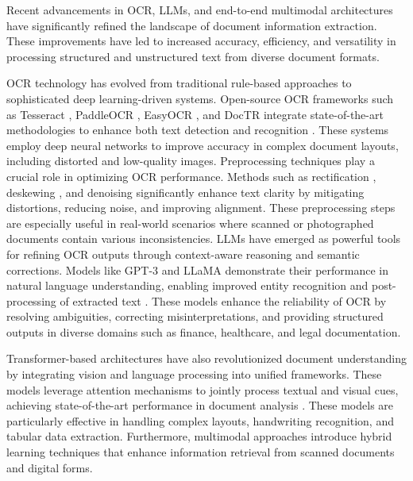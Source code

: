 \documentclass[11pt]{article}
\begin{document}
Recent advancements in OCR, LLMs, and end-to-end multimodal architectures have significantly refined the landscape of document information extraction. These improvements have led to increased accuracy, efficiency, and versatility in processing structured and unstructured text from diverse document formats.

OCR technology has evolved from traditional rule-based approaches to sophisticated deep learning-driven systems. Open-source OCR frameworks such as Tesseract \cite{tesseract}, PaddleOCR \cite{ppocrv2}, EasyOCR \cite{easyocr}, and DocTR \cite{doctr} integrate state-of-the-art methodologies to enhance both text detection \cite{liao2019, liao2022} and recognition \cite{shi2015, li2022}. These systems employ deep neural networks to improve accuracy in complex document layouts, including distorted and low-quality images. Preprocessing techniques play a crucial role in optimizing OCR performance. Methods such as rectification \cite{shi2019}, deskewing \cite{pham2022}, and denoising \cite{zhao2018} significantly enhance text clarity by mitigating distortions, reducing noise, and improving alignment. These preprocessing steps are especially useful in real-world scenarios where scanned or photographed documents contain various inconsistencies. LLMs have emerged as powerful tools for refining OCR outputs through context-aware reasoning and semantic corrections. Models like GPT-3 \cite{brown2020} and LLaMA \cite{touvron2023} demonstrate their performance in natural language understanding, enabling improved entity recognition and post-processing of extracted text \cite{yenduri2023}. These models enhance the reliability of OCR by resolving ambiguities, correcting misinterpretations, and providing structured outputs in diverse domains such as finance, healthcare, and legal documentation.

Transformer-based architectures \cite{vaswani2017, dosovitskiy2021} have also revolutionized document understanding by integrating vision and language processing into unified frameworks. These models leverage attention mechanisms to jointly process textual and visual cues, achieving state-of-the-art performance in document analysis \cite{kim2022,appalaraju2021}. These models are particularly effective in handling complex layouts, handwriting recognition, and tabular data extraction. Furthermore, multimodal approaches \cite{peng2022, li2021} introduce hybrid learning techniques that enhance information retrieval from scanned documents and digital forms.
\end{document}
